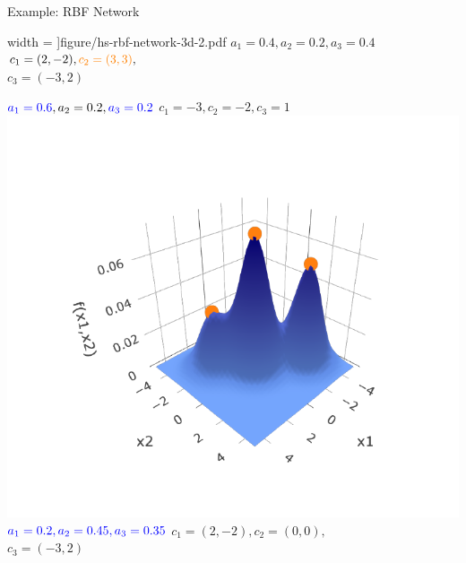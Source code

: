 \documentclass[11pt,compress,t,notes=noshow, xcolor=table]{beamer}
\begin{document}
\begin{vbframe}{Example: RBF Network}
\begin{minipage}{0.33\textwidth}
\begin{center}
    width = \textwidth]{figure/hs-rbf-network-3d-2.pdf}
    $a_1 = 0.4, a_2 = 0.2, a_3 = 0.4$ \\
    $c_1 = (2,-2), \textcolor{orange}{c_2 = (3,3)},$ \\
    $c_3 = (-3,2)$
  \end{center}
\end{minipage}%
\begin{minipage}{0.33\textwidth}
  \begin{center}
    $\textcolor{blue}{a_1 = 0.6}, a_2 = 0.2, \textcolor{blue}{a_3 = 0.2}$
    $c_1 = -3, c_2 = -2, c_3 = 1$
    \includegraphics[trim = 50 30 50 50, clip, 
    width = \textwidth]{figure/hs-rbf-network-3d-3.pdf}
    $\textcolor{blue}{a_1 = 0.2, a_2 = 0.45, a_3 = 0.35}$
    $c_1 = (2,-2), c_2 = (0,0),$ \\
    $c_3 = (-3,2)$
  \end{center}
\end{minipage}

\normalsize


\end{vbframe}
\end{document}
